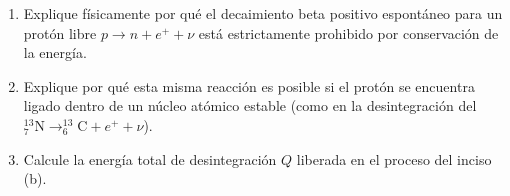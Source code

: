 \item \begin{enumerate}
    \item Explique físicamente por qué el decaimiento beta positivo espontáneo para un protón libre $p \to n + e^+ + \nu$ está estrictamente prohibido por conservación de la energía.
    \item Explique por qué esta misma reacción es posible si el protón se encuentra ligado dentro de un núcleo atómico estable (como en la desintegración del $^{13}_{7}\text{N} \to ^{13}_{6}\text{C} + e^+ + \nu$).
    \item Calcule la energía total de desintegración $Q$ liberada en el proceso del inciso (b).
\end{enumerate}